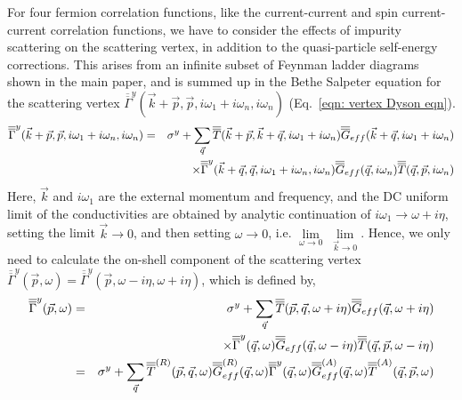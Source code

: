 \documentclass[letter,12pt,preprint,aps]{revtex4-1}
\newcommand{\ba}{\begin{eqnarray}}
\newcommand{\ea}{\end{eqnarray}}
\newcommand{\Gbar}{\overline{\overline{G}}}
\newcommand{\Tbar}{\overline{\overline{T}}}
\newcommand{\Gammabar}{\overline{\overline{\Gamma}}}
\begin{document}
For four fermion correlation functions, like the current-current and spin current-current correlation functions, we have to consider the effects of impurity scattering on the scattering vertex\cite{Mahan2000}, in addition to the quasi-particle self-energy corrections. This arises from an infinite subset of Feynman ladder diagrams shown in the main paper, and is summed up in the Bethe Salpeter equation for the scattering vertex $\Gammabar^{y}(\vec{k} + \vec{p}, \vec{p}, i \omega_1 + i \omega_n, i \omega_n)$ (Eq.~\ref{eqn: vertex Dyson eqn}).
%
\ba
\label{eqn: vertex Dyson eqn}
\Gammabar^{y}(\vec{k} + \vec{p}, \vec{p}, i \omega_1 + i \omega_n, i \omega_n) & = & \sigma^y + \sum_{\vec{q}} \Tbar(\vec{k} + \vec{p}, \vec{k} + \vec{q}, i \omega_1 + i \omega_n) \Gbar_{eff}(\vec{k}+\vec{q}, i \omega_1 + i \omega_n) \cr
& & \times \Gammabar^{y}(\vec{k} + \vec{q}, \vec{q}, i \omega_1 + i \omega_n, i \omega_n) \Gbar_{eff}(\vec{q}, i \omega_n) \Tbar(\vec{q}, \vec{p}, i \omega_n)
\ea
%
Here, $\vec{k}$ and $i \omega_1$ are the  external momentum and frequency, and the DC uniform limit of the conductivities are obtained by analytic continuation of $i \omega_1 \rightarrow \omega + i \eta$, setting the limit $\vec{k} \rightarrow 0$, and then setting $\omega \rightarrow 0$, i.e. $\underset{\omega \to 0}{\lim} \; \underset{\vec{k} \to 0}{\lim} $. Hence, we only need to calculate the on-shell component of the scattering vertex $\Gammabar^{y}(\vec{p}, \omega) = \Gammabar^{y}(\vec{p}, \omega - i \eta, \omega + i \eta)$, which is defined by,
%
\ba
\Gammabar^{y}(\vec{p}, \omega) & =  & \sigma^y + \sum_{\vec{q}} \Tbar(\vec{p}, \vec{q}, \omega + i \eta) \Gbar_{eff}(\vec{q}, \omega + i \eta) \cr
& & \times \Gammabar^{y}(\vec{q}, \omega) \Gbar_{eff}(\vec{q}, \omega - i \eta) \Tbar(\vec{q}, \vec{p}, \omega - i \eta) \cr
 & =  & \sigma^y + \sum_{\vec{q}}  \Tbar^{(R)}(\vec{p}, \vec{q}, \omega) \Gbar_{eff}^{(R)}(\vec{q}, \omega) \Gammabar^{y}(\vec{q}, \omega) \Gbar_{eff}^{(A)}(\vec{q}, \omega) \Tbar^{(A)}(\vec{q}, \vec{p}, \omega)
\ea
\end{document}
